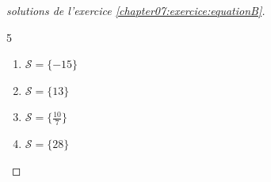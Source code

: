 \documentclass[main.tex]{subfiles}
\begin{document}
\begin{proof}[solutions de l'exercice \ref{chapter07:exercice:equationB}]\hfill
	\begin{multicols}{5}
		\begin{enumerate}[label={$(E_{\arabic*}$)}, leftmargin=*] 
			\item  $\mathcal{S}=\{-15\}$
			\item  $\mathcal{S}=\{13\}$
			\item  $\mathcal{S}=\{\frac{10}{7}\}$
			\item $\mathcal{S}=\{28\}$ 
		\end{enumerate}
	\end{multicols} \scriptsize	
\end{proof}
\end{document}
